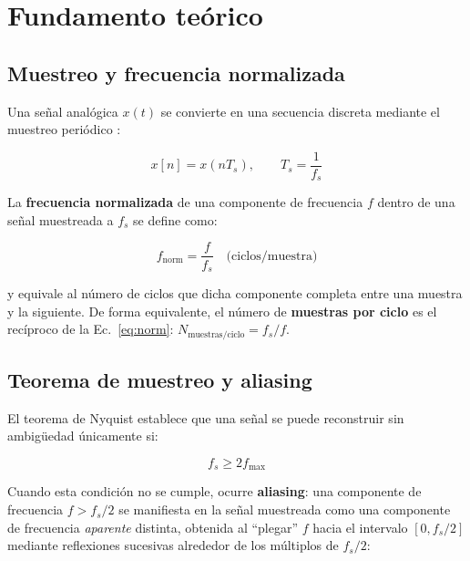 
\section{Fundamento teórico}

\subsection{Muestreo y frecuencia normalizada}
\label{sec:muestreo}

Una señal analógica $x(t)$ se convierte en una secuencia discreta mediante el muestreo periódico \cite{oppenheim}:

\begin{equation}
x[n] = x(nT_s), \qquad T_s = \frac{1}{f_s}
\end{equation}

La \textbf{frecuencia normalizada} de una componente de frecuencia $f$ dentro de una señal muestreada a $f_s$ se define como:

\begin{equation}
f_{\text{norm}} = \frac{f}{f_s} \quad \text{(ciclos/muestra)}
\label{eq:norm}
\end{equation}

y equivale al número de ciclos que dicha componente completa entre una muestra y la siguiente. De forma equivalente, el número de \textbf{muestras por ciclo} es el recíproco de la Ec.~\ref{eq:norm}: $N_{\text{muestras/ciclo}} = f_s/f$.

\subsection{Teorema de muestreo y aliasing}

El teorema de Nyquist establece que una señal se puede reconstruir sin ambigüedad únicamente si:

\begin{equation}
f_s \geq 2 f_{\max}
\end{equation}

Cuando esta condición no se cumple, ocurre \textbf{aliasing}: una componente de frecuencia $f > f_s/2$ se manifiesta en la señal muestreada como una componente de frecuencia \emph{aparente} distinta, obtenida al ``plegar'' $f$ hacia el intervalo $[0, f_s/2]$ mediante reflexiones sucesivas alrededor de los múltiplos de $f_s/2$:

